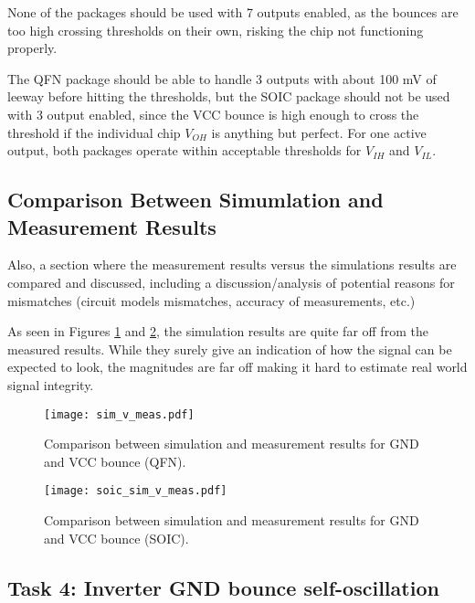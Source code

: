 \documentclass[../main.tex]{subfiles}
\begin{document}
None of the packages should be used with 7 outputs enabled, as the bounces are too high crossing thresholds on their own, risking the chip not functioning properly. 

The QFN package should be able to handle 3 outputs with about 100 mV of leeway before hitting the thresholds, but the SOIC package should not be used with 3 output enabled, since the VCC bounce is high enough to cross the threshold if the individual chip $V_{OH}$ is anything but perfect. For one active output, both packages operate within acceptable thresholds for $V_{IH}$ and $V_{IL}$. 


\newpage

\subsection{Comparison Between Simumlation and Measurement Results}

Also, a section where the measurement results versus the simulations results are compared and discussed, including a discussion/analysis of potential reasons for mismatches (circuit models mismatches, accuracy of measurements, etc.)

\solution

As seen in Figures \ref{fig:sim_v_meas} and \ref{fig:soic-sim_v_meas}, the simulation results are quite far off from the measured results. While they surely give an indication of how the signal can be expected to look, the magnitudes are far off making it hard to estimate real world signal integrity.

\begin{figure}[h]
    \centering
    \texttt{[image: sim\_v\_meas.pdf]}
    \caption{Comparison between simulation and measurement results for GND and VCC bounce (QFN).}
    \label{fig:sim_v_meas}
\end{figure}

\begin{figure}[h]
    \centering
    \texttt{[image: soic\_sim\_v\_meas.pdf]}
    \caption{Comparison between simulation and measurement results for GND and VCC bounce (SOIC).}
    \label{fig:soic-sim_v_meas}
\end{figure}

\newpage

\subsection{Task 4: Inverter GND bounce self-oscillation}
\end{document}
